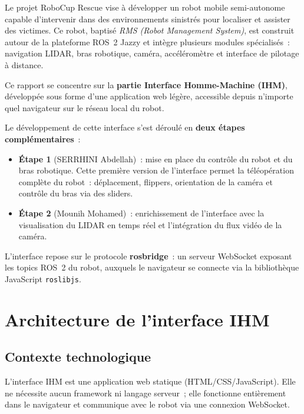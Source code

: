 \documentclass[12pt,a4paper]{report}
\begin{document}
Le projet RoboCup Rescue vise à développer un robot mobile semi-autonome capable d'intervenir dans des environnements sinistrés pour localiser et assister des victimes. Ce robot, baptisé \textit{RMS (Robot Management System)}, est construit autour
de la plateforme ROS~2 Jazzy et intègre plusieurs modules spécialisés~: navigation LIDAR, bras robotique, caméra, accéléromètre et interface de pilotage à distance.

Ce rapport se concentre sur la \textbf{partie Interface Homme-Machine (IHM)}, développée sous forme d'une application web légère, accessible depuis n'importe quel navigateur sur le réseau local du robot.

Le développement de cette interface s'est déroulé en \textbf{deux étapes complémentaires}~:

\begin{itemize}
  \item \textbf{Étape 1} (SERRHINI Abdellah)~: mise en place du contrôle du robot et du bras robotique. Cette première version de l'interface permet la téléopération complète du robot~: déplacement, flippers, orientation de la caméra et contrôle du bras via des sliders.
  \item \textbf{Étape 2} (Mounih Mohamed)~: enrichissement de l'interface avec la visualisation du LIDAR en temps réel et l'intégration du flux vidéo de la caméra.
\end{itemize}

L'interface repose sur le protocole \textbf{rosbridge}~: un serveur WebSocket exposant les topics ROS~2 du robot, auxquels le navigateur se connecte via la bibliothèque JavaScript \texttt{roslibjs}.

\chapter{Architecture de l'interface IHM}

\section{Contexte technologique}

L'interface IHM est une application web statique (HTML/CSS/JavaScript). Elle ne nécessite aucun framework ni langage serveur~; elle fonctionne entièrement dans le navigateur et communique avec le robot via une connexion WebSocket.
\end{document}

